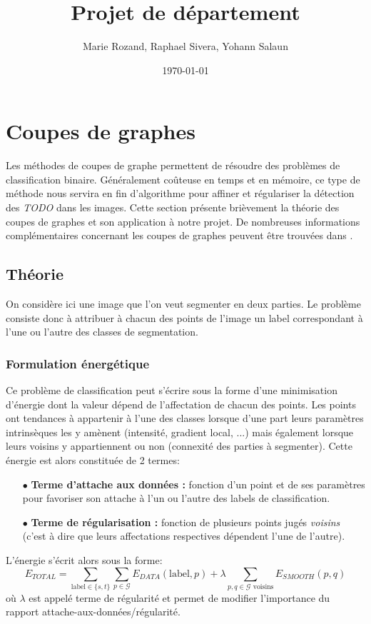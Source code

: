 \documentclass{article}
\title{Projet de département}
\author{Marie Rozand, Raphael Sivera, Yohann Salaun}
\date{\today}
\newcommand{\lab}{\text{label}}
\begin{document}
\maketitle

\section{Coupes de graphes}

Les méthodes de coupes de graphe permettent de résoudre des problèmes de classification binaire. Généralement coûteuse en temps et en mémoire, ce type de méthode nous servira en fin d'algorithme pour affiner et régulariser la détection des \textit{TODO} dans les images. Cette section présente brièvement la théorie des coupes de graphes et son application à notre projet. De nombreuses informations complémentaires concernant les coupes de graphes peuvent être trouvées dans \cite{bib:GC04, bib:GC05}.		

\subsection{Théorie}

On considère ici une image que l'on veut segmenter en deux parties. Le problème consiste donc à attribuer à chacun des points de l'image un label correspondant à l'une ou l'autre des classes de segmentation.

\subsubsection{Formulation énergétique}

Ce problème de classification peut s'écrire sous la forme d'une minimisation d'énergie dont la valeur dépend de l'affectation de chacun des points. Les points ont tendances à appartenir à l'une des classes lorsque d'une part leurs paramètres intrinsèques les y amènent (intensité, gradient local, ...) mais également lorsque leurs voisins y appartiennent ou non (connexité des parties à segmenter). Cette énergie est alors constituée de 2 termes:
\begin{itemize}
	\item[$\bullet$]\textbf{Terme d'attache aux données :} fonction d'un point et de ses paramètres pour favoriser son attache à l'un ou l'autre des labels de classification.
	\item[$\bullet$]\textbf{Terme de régularisation :} fonction de plusieurs points jugés \textit{voisins} (c'est à dire que leurs affectations respectives dépendent l'une de l'autre).
\end{itemize}
L'énergie s'écrit alors sous la forme:
\[
	E_{TOTAL} = \sum_{\lab \in \{s,t\}} \sum_{p \in \mathcal{G}} E_{DATA}(\lab, p) + \lambda \sum _{p,q \in \mathcal{G} \text{ voisins}} E_{SMOOTH}(p,q)
\]
où $\lambda$ est appelé terme de régularité et permet de modifier l'importance du rapport attache-aux-données/régularité.\\
\end{document}
